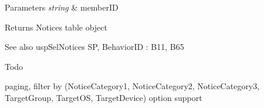 \begin{DoxyParams}{Parameters}
{\em string} & member\+ID \\
\hline
\end{DoxyParams}
\begin{DoxyReturn}{Returns}
Notices table object 
\end{DoxyReturn}
\begin{DoxySeeAlso}{See also}
usp\+Sel\+Notices SP, Behavior\+ID \+: B11, B65 
\end{DoxySeeAlso}
\begin{DoxyRefDesc}{Todo}
\item[\hyperlink{a00001__todo000012}{Todo}]paging, filter by (Notice\+Category1, Notice\+Category2, Notice\+Category3, Target\+Group, Target\+OS, Target\+Device) option support \end{DoxyRefDesc}
